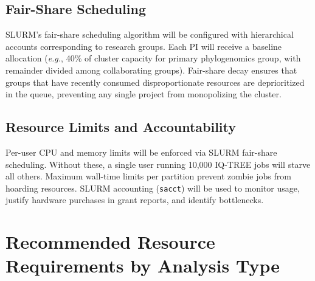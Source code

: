 \begin{table}[htbp]
\centering
\caption{Recommended SLURM Partitions}
\end{table}

\subsection{Fair-Share Scheduling}

SLURM's fair-share scheduling algorithm will be configured with hierarchical accounts corresponding to research groups. Each PI will receive a baseline allocation (\textit{e.g.}, 40\% of cluster capacity for primary phylogenomics group, with remainder divided among collaborating groups). Fair-share decay ensures that groups that have recently consumed disproportionate resources are deprioritized in the queue, preventing any single project from monopolizing the cluster.

\subsection{Resource Limits and Accountability}

Per-user CPU and memory limits will be enforced via SLURM fair-share scheduling. Without these, a single user running 10,000 IQ-TREE jobs will starve all others. Maximum wall-time limits per partition prevent zombie jobs from hoarding resources. SLURM accounting (\texttt{sacct}) will be used to monitor usage, justify hardware purchases in grant reports, and identify bottlenecks.

\section{Recommended Resource Requirements by Analysis Type}

